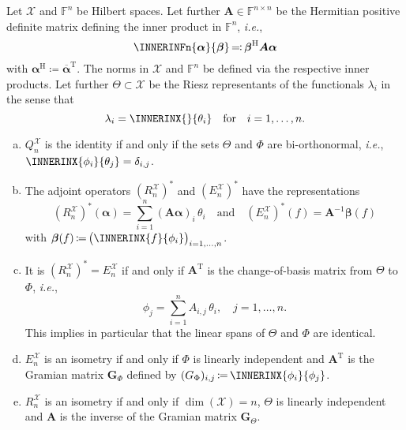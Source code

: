 \documentclass[a4paper]{paper}
\newcommand*{\SPC}[1]{{\ensuremath{\mathscr{#1}}}}
\newcommand*{\SPCX}{\SPC{X}}
\newcommand*{\FIELD}{{\ensuremath{\mathbb{F}}}}
\newcommand*{\Fn}{{\ensuremath{\FIELD^n}}}
\newcommand*{\Fnxn}{{\ensuremath{\FIELD^{n \times n}}}}
\newcommand*{\EXT}[2]{\ensuremath{E_{#1}^{#2}}}
\newcommand*{\REST}[2]{\ensuremath{R_{#1}^{#2}}}
\newcommand*{\COPROJ}[2]{\ensuremath{Q_{#1}^{#2}}}
\newcommand*{\RnX}{{\ensuremath{\REST{n}{\SPC{X}}}}}
\newcommand*{\EnX}{{\ensuremath{\EXT{n}{\SPC{X}}}}}
\newcommand*{\QnX}{{\ensuremath{\COPROJ{n}{\SPCX}}}}
\DeclareMathOperator{\DIM}{{dim}}
\DeclareMathOperator{\DEFEQ}{{\coloneqq}}
\DeclareMathOperator{\EQDEF}{{\eqqcolon}}
\newcommand*{\CCONJ}[1]{{\ensuremath{\overline{#1}}}}
\newcommand*{\TRANSP}[1]{{\ensuremath{#1^{\mathrm{T}}}}}
\newcommand*{\HERM}[1]{{\ensuremath{#1^{\mathrm{H}}}}}
\newcommand*{\ie}{\textsl{i.e.}\xspace}
\newcommand*{\BDalpha}{\boldsymbol{\alpha}}
\newcommand*{\BDbeta}{\boldsymbol{\beta}}
\newcommand*{\BDA}{\boldsymbol{A}}
\newcommand*{\BDG}{\boldsymbol{G}}
\begin{document}
\begin{lemma}
 \label{lemma:specif:funct:op_prop_hilbert}
 Let $\SPCX$ and $\Fn$ be Hilbert spaces. Let further $\BDA \in \Fnxn$ be the Hermitian positive 
 definite matrix defining the inner product in $\Fn$, \ie,
 \begin{equation*}
  \INNERINFn{\BDalpha}{\BDbeta} \EQDEF \HERM{\BDbeta} \BDA \BDalpha
 \end{equation*}
 with $\HERM{\BDalpha} \DEFEQ  \TRANSP{\CCONJ{\BDalpha}}$. The norms in $\SPCX$ and $\Fn$ be defined via 
 the respective inner products. Let further $\Theta \subset \SPCX$ be the Riesz representants of the functionals 
 $\lambda_i$ in the sense that
 \begin{equation*}
  \lambda_i = \INNERINX{}{\theta_i}
  \quad \text{for} \quad 
  i=1,\dots,n.
 \end{equation*}
 \begin{enumerate}[(a)]
  \item \label{lemma:specif:funct:op_prop_hilbert:Q_identity}
  $\QnX$ is the identity if and only if the sets $\Theta$ and $\Phi$ are bi-orthonormal, \ie, 
  $\INNERINX{\phi_i}{\theta_j} = \delta_{i,j}$.
 
  \item \label{lemma:specif:funct:op_prop_hilbert:R_adjoint_repr}
  The adjoint operators $(\RnX)^*$ and $(\EnX)^*$ have the representations
  \begin{equation*}
   (\RnX)^*(\BDalpha) = \sum_{i=1}^n (\BDA \BDalpha)_i\, \theta_i
   \quad \text{and} \quad
   (\EnX)^*(f) = \BDA^{-1} \BDbeta(f)
  \end{equation*}
  with $\BDbeta(f) \DEFEQ \big( \INNERINX{f}{\phi_i} \big)_{i=1,\dots,n}$.
  
  \item \label{lemma:specif:funct:op_prop_hilbert:R_E_adjoint_relation}
  It is $(\RnX)^* = \EnX$ if and only if $\TRANSP{\BDA}$ is the change-of-basis matrix from $\Theta$ to $\Phi$, \ie,
  \begin{equation*}
   \phi_j = \sum_{i=1}^n A_{i,j}\, \theta_i, \quad j=1,\dots,n.
  \end{equation*}
  This implies in particular that the linear spans of $\Theta$ and $\Phi$ are identical.
 
  \item  \label{lemma:specif:funct:op_prop_hilbert:E_isometry}
  $\EnX$ is an isometry if and only if $\Phi$ is linearly independent and $\TRANSP{\BDA}$ is the Gramian matrix 
  $\BDG_\Phi$ defined by $(G_\Phi)_{i,j} \DEFEQ  \INNERINX{\phi_i}{\phi_j}$.
  
  \item \label{lemma:specif:funct:op_prop_hilbert:R_isometry}
  $\RnX$ is an isometry if and only if $\DIM(\SPCX) = n$, $\Theta$ is linearly independent and $\BDA$ is the 
  inverse of the Gramian matrix $\BDG_\Theta$.
 \end{enumerate}
\end{lemma}
\vspace{1em}
\end{document}
